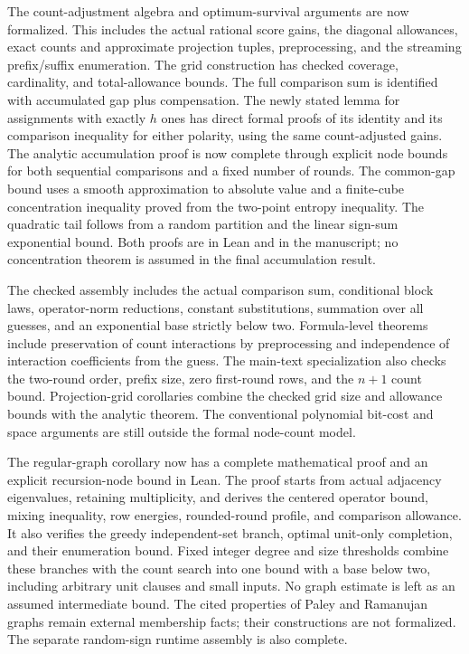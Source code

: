 \documentclass[11pt,a4paper]{article}
\begin{document}
The count-adjustment algebra and optimum-survival arguments are now
formalized. This includes the actual rational score gains, the diagonal
allowances, exact counts and approximate projection tuples, preprocessing,
and the streaming prefix/suffix enumeration. The grid construction has
checked coverage, cardinality, and total-allowance bounds. The full
comparison sum is identified with accumulated gap plus compensation.
The newly stated lemma for assignments with exactly $h$ ones has direct
formal proofs of its identity and its comparison inequality for either
polarity, using the same count-adjusted gains.
The analytic accumulation proof is now complete through explicit node
bounds for both sequential comparisons and a fixed number of rounds.
The common-gap bound uses a smooth approximation to absolute value and a
finite-cube concentration inequality proved from the two-point entropy
inequality. The quadratic tail follows from a random partition and the linear
sign-sum exponential bound. Both proofs are in Lean and in the manuscript;
no concentration theorem is assumed in the final accumulation result.

The checked assembly includes the actual comparison sum, conditional block
laws, operator-norm reductions, constant substitutions, summation over all
guesses, and an exponential base strictly below two. Formula-level theorems
include preservation of count interactions by preprocessing and independence
of interaction coefficients from the guess. The main-text specialization
also checks the two-round order, prefix size, zero first-round rows, and the
$n+1$ count bound. Projection-grid corollaries combine the checked grid size
and allowance bounds with the analytic theorem. The conventional polynomial
bit-cost and space arguments are still outside the formal node-count model.

The regular-graph corollary now has a complete mathematical proof and
an explicit recursion-node bound in Lean. The proof starts from actual
adjacency eigenvalues, retaining multiplicity, and derives the centered
operator bound, mixing inequality, row energies, rounded-round profile,
and comparison allowance. It also verifies the greedy independent-set
branch, optimal unit-only completion, and their enumeration bound.
Fixed integer degree and size thresholds combine these branches with the
count search into one bound with a base below two, including arbitrary
unit clauses and small inputs. No graph estimate is left as an assumed
intermediate bound. The cited properties of Paley and Ramanujan graphs
remain external membership facts; their constructions are not formalized.
The separate random-sign runtime assembly is also complete.
\end{document}
